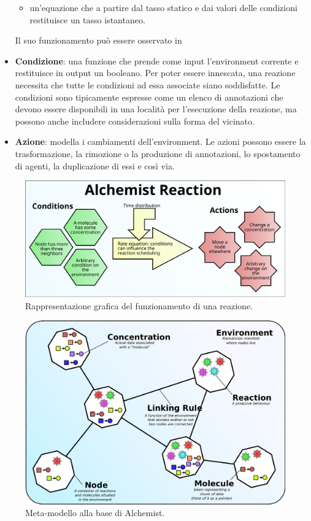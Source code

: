 \documentclass[12pt,a4paper,openright,twoside]{book}
\begin{document}
\begin{itemize}
\begin{itemize}
        \item un'equazione che a partire dal tasso statico e dai valori delle condizioni restituisce un tasso istantaneo.
    \end{itemize}
    Il suo funzionamento può essere osservato in~
    \item \textbf{Condizione}: una funzione che prende come input l'environment corrente e restituisce in output un booleano. Per poter essere innescata, una reazione necessita che tutte le condizioni ad essa associate siano soddisfatte. Le condizioni sono tipicamente espresse come un elenco di annotazioni che devono essere disponibili in una località per l'esecuzione della reazione, ma possono anche includere considerazioni sulla forma del vicinato.
    \item \textbf{Azione}: modella i cambiamenti dell'environment. Le azioni possono essere la trasformazione, la rimozione o la produzione di annotazioni, lo spostamento di agenti, la duplicazione di essi e così via.
\end{itemize}

\begin{figure}
    \centering
    \includegraphics[width=.85\linewidth]{figures/discrete-event-simulation/alchemist-reaction.pdf}
    \caption{Rappresentazione grafica del funzionamento di una reazione.}
    \label{fig:alchemist-reaction}
\end{figure}

\begin{figure}
    \centering
    \includegraphics[width=.85\linewidth]{figures/discrete-event-simulation/alchemist-meta-model.pdf}
    \caption{Meta-modello alla base di Alchemist.}
    \label{fig:alchemist-model}
\end{figure}
\end{document}
